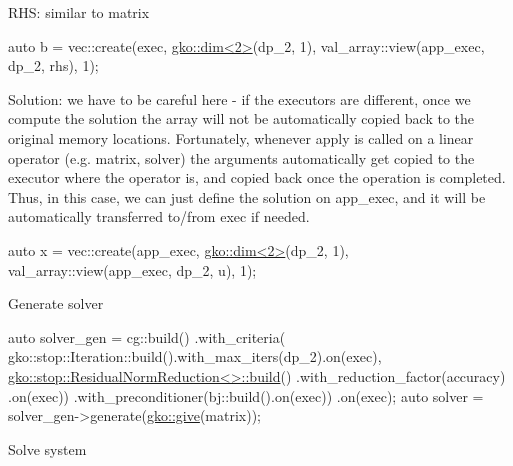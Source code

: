 {\ttfamily  R\+HS\+: similar to matrix}

{\ttfamily 
\begin{DoxyCode}
\textcolor{keyword}{auto} b = vec::create(exec, \hyperlink{structgko_1_1dim}{gko::dim<2>}(dp\_2, 1),
                     val\_array::view(app\_exec, dp\_2, rhs), 1);
\end{DoxyCode}
}

{\ttfamily  Solution\+: we have to be careful here -\/ if the executors are different, once we compute the solution the array will not be automatically copied back to the original memory locations. Fortunately, whenever {\ttfamily apply} is called on a linear operator (e.\+g. matrix, solver) the arguments automatically get copied to the executor where the operator is, and copied back once the operation is completed. Thus, in this case, we can just define the solution on {\ttfamily app\+\_\+exec}, and it will be automatically transferred to/from {\ttfamily exec} if needed.}

{\ttfamily 
\begin{DoxyCode}
\textcolor{keyword}{auto} x = vec::create(app\_exec, \hyperlink{structgko_1_1dim}{gko::dim<2>}(dp\_2, 1),
                     val\_array::view(app\_exec, dp\_2, u), 1);
\end{DoxyCode}
}

{\ttfamily  Generate solver}

{\ttfamily 
\begin{DoxyCode}
\textcolor{keyword}{auto} solver\_gen =
    cg::build()
        .with\_criteria(
            gko::stop::Iteration::build().with\_max\_iters(dp\_2).on(exec),
            \hyperlink{classgko_1_1stop_1_1ResidualNormReduction}{gko::stop::ResidualNormReduction<>::build}()
                .with\_reduction\_factor(accuracy)
                .on(exec))
        .with\_preconditioner(bj::build().on(exec))
        .on(exec);
\textcolor{keyword}{auto} solver = solver\_gen->generate(\hyperlink{namespacegko_acbd3fd6d07e498892881e8e2ab0b4167}{gko::give}(matrix));
\end{DoxyCode}
}

{\ttfamily  Solve system}

